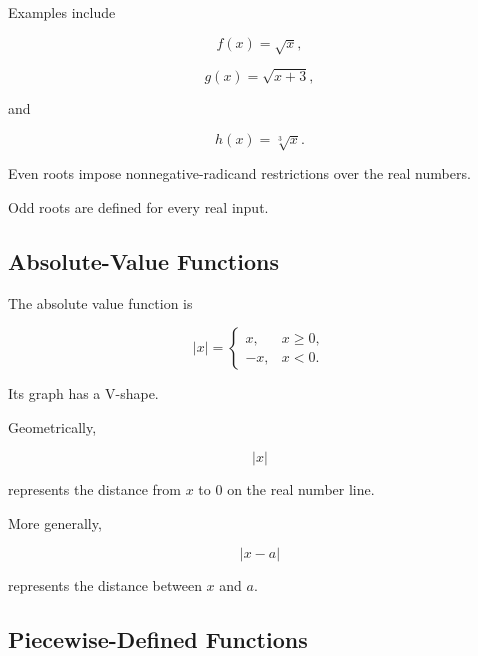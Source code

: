 Examples include

\[ f(x)=\sqrt{x}, \]

\[ g(x)=\sqrt{x+3}, \]

and

\[ h(x)=\sqrt[3]{x}. \]

Even roots impose nonnegative-radicand restrictions over the real numbers.

Odd roots are defined for every real input.

\subsection{Absolute-Value Functions}
\label{subsec:absolute-value-functions}

The absolute value function is

\[
|x|=
\begin{cases}
x, & x\geq0,\\
-x, & x<0.
\end{cases}
\]

Its graph has a V-shape.

\begin{center}
\end{center}

Geometrically,

\[ |x| \]

represents the distance from \(x\) to \(0\) on the real number line.

More generally,

\[ |x-a| \]

represents the distance between \(x\) and \(a\).

\subsection{Piecewise-Defined Functions}
\label{subsec:piecewise-functions}

